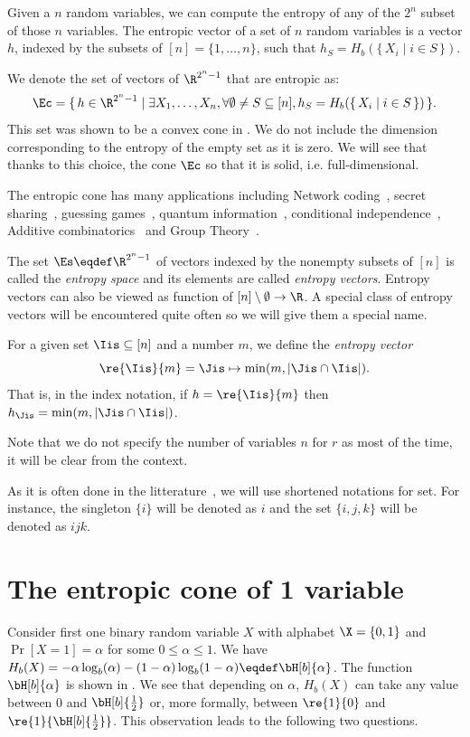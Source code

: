 \documentclass[11pt,twoside,a4paper,openright]{uclouvain-thesis}
\begin{document}
Given a $n$ random variables, we can compute the entropy of any of the $2^n$ subset of those $n$ variables.
The entropic vector of a set of $n$ random variables is a vector $h$, indexed by the subsets of $[n] = \{1, \ldots, n\}$,
such that $h_S = H_b(\{\, X_i \mid i \in S\,\})$.

We denote the set of vectors of $\R^{2^n-1}$ that are entropic as:
\[ \Ec = \{\, h \in \R^{2^n-1} \mid \exists X_1, \ldots, X_n, \forall \emptyset \neq S \subseteq [n], h_S = H_b(\{\, X_i \mid i \in S\,\}) \,\}. \]
This set was shown to be a convex cone in \cite[Theorem~1]{zhang1997non}.
We do not include the dimension corresponding to the entropy of the empty set as it is zero.
We will see that thanks to this choice, the cone $\Ec$ so that it is solid, i.e. full-dimensional.

The entropic cone has many applications including
Network coding~\cite{bassoli2013network, chan2007entropy, dougherty2005insufficiency},
secret sharing~\cite{beimel2011secret, marti2007secret},
guessing games~\cite{baber2013multiple},
quantum information~\cite{pippenger2003inequalities},
conditional independence~\cite{matuvs1995conditional},
Additive combinatorics~\cite{madiman2010information} and
Group Theory~\cite{chan2002relation}.

The set $\Es \eqdef \R^{2^n-1}$ of vectors indexed by the nonempty subsets of $[n]$ is called the \emph{entropy space} and
its elements are called \emph{entropy vectors}.
Entropy vectors can also be viewed as function of $[n]\setminus\emptyset \to \R$.
A special class of entropy vectors will be encountered quite often
so we will give them a special name.
\begin{mydef}
  For a given set $\Iis \subseteq [n]$ and a number $m$,
  we define the \emph{entropy vector}
  \[
    \re{\Iis}{m} = \Jis \mapsto \min(m, |\Jis \cap \Iis|).
  \]
  That is, in the index notation,
  if $h = \re{\Iis}{m}$ then
  $h_\Jis = \min(m, |\Jis \cap \Iis|)$.
\end{mydef}
Note that we do not specify the number of variables $n$ for $r$ as
most of the time, it will be clear from the context.

As it is often done in the litterature~\cite{chan2011recent,matus2013entropy}, we will use shortened notations for set.
For instance, the singleton $\{i\}$ will be denoted as $i$ and the set $\{i,j,k\}$ will be denoted as $ijk$.

\section{The entropic cone of 1 variable}
\label{sec:1var}
Consider first one binary random variable $X$ with alphabet $\X = \{0,1\}$ and $\Pr[X = 1] = \alpha$ for some $0 \leq \alpha \leq 1$.
We have $H_b(X) = -\alpha\log_b(\alpha) - (1-\alpha)\log_b(1-\alpha) \eqdef \bH[b]{\alpha}$.
The function $\bH[b]{\alpha}$ is shown in .
We see that depending on $\alpha$, $H_b(X)$ can take any value between $0$ and $\bH[b]{\frac{1}{2}}$ or,
more formally, between $\re{1}{0}$ and $\re{1}{\bH[b]{\frac{1}{2}}}$.
This observation leads to the following two questions.
\end{document}

